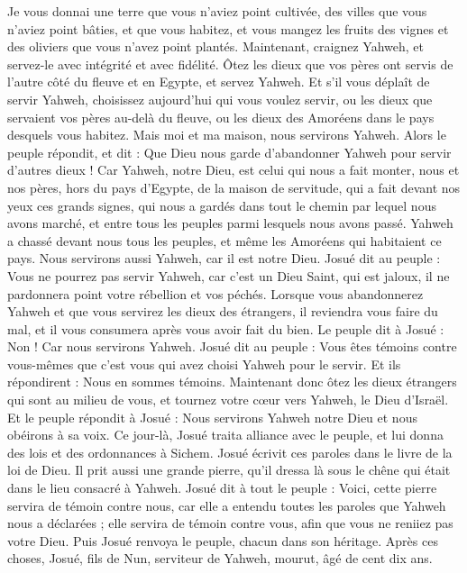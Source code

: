 \begin{multicols}{2}
Je vous donnai une terre que vous n’aviez point cultivée, des villes que vous n’aviez point bâties, et que vous habitez, et vous mangez les fruits des vignes et des oliviers que vous n’avez point plantés.
Maintenant, craignez Yahweh, et servez-le avec intégrité et avec fidélité. Ôtez les dieux que vos pères ont servis de l’autre côté du fleuve et en Egypte, et servez Yahweh.
Et s’il vous déplaît de servir Yahweh, choisissez aujourd’hui qui vous voulez servir, ou les dieux que servaient vos pères au-delà du fleuve, ou les dieux des Amoréens dans le pays desquels vous habitez. Mais moi et ma maison, nous servirons Yahweh.
Alors le peuple répondit, et dit : Que Dieu nous garde d’abandonner Yahweh pour servir d’autres dieux !
Car Yahweh, notre Dieu, est celui qui nous a fait monter, nous et nos pères, hors du pays d’Egypte, de la maison de servitude, qui a fait devant nos yeux ces grands signes, qui nous a gardés dans tout le chemin par lequel nous avons marché, et entre tous les peuples parmi lesquels nous avons passé.
Yahweh a chassé devant nous tous les peuples, et même les Amoréens qui habitaient ce pays. Nous servirons aussi Yahweh, car il est notre Dieu.
Josué dit au peuple : Vous ne pourrez pas servir Yahweh, car c’est un Dieu Saint, qui est jaloux, il ne pardonnera point votre rébellion et vos péchés.
Lorsque vous abandonnerez Yahweh et que vous servirez les dieux des étrangers, il reviendra vous faire du mal, et il vous consumera après vous avoir fait du bien.
Le peuple dit à Josué : Non ! Car nous servirons Yahweh.
Josué dit au peuple : Vous êtes témoins contre vous-mêmes que c’est vous qui avez choisi Yahweh pour le servir. Et ils répondirent : Nous en sommes témoins.
Maintenant donc ôtez les dieux étrangers qui sont au milieu de vous, et tournez votre cœur vers Yahweh, le Dieu d’Israël.
Et le peuple répondit à Josué : Nous servirons Yahweh notre Dieu et nous obéirons à sa voix.
Ce jour-là, Josué traita alliance avec le peuple, et lui donna des lois et des ordonnances à Sichem.
Josué écrivit ces paroles dans le livre de la loi de Dieu. Il prit aussi une grande pierre\FTNT{}, qu’il dressa là sous le chêne qui était dans le lieu consacré à Yahweh.
Josué dit à tout le peuple : Voici, cette pierre servira de témoin contre nous, car elle a entendu toutes les paroles que Yahweh nous a déclarées ; elle servira de témoin contre vous, afin que vous ne reniiez pas votre Dieu.
Puis Josué renvoya le peuple, chacun dans son héritage.
Après ces choses, Josué, fils de Nun, serviteur de Yahweh, mourut, âgé de cent dix ans.

\end{multicols}
